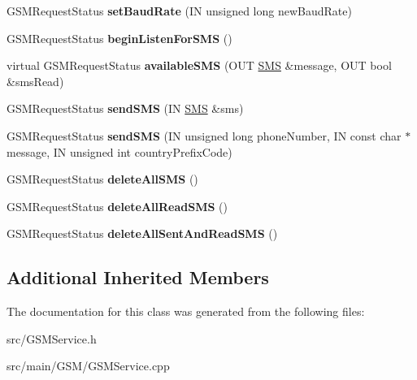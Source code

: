 \begin{DoxyCompactItemize}
G\+S\+M\+Request\+Status {\bfseries set\+Baud\+Rate} (IN unsigned long new\+Baud\+Rate)
\item 
\mbox{\label{class_easyuino_1_1_g_s_m_service_a8fd764ef215a16f676e6e5e4b283b61d}} 
G\+S\+M\+Request\+Status {\bfseries begin\+Listen\+For\+S\+MS} ()
\item 
\mbox{\label{class_easyuino_1_1_g_s_m_service_a4d987881793f811e1a032bc48e5f7861}} 
virtual G\+S\+M\+Request\+Status {\bfseries available\+S\+MS} (O\+UT \hyperlink{class_easyuino_1_1_s_m_s}{S\+MS} \&message, O\+UT bool \&sms\+Read)
\item 
\mbox{\label{class_easyuino_1_1_g_s_m_service_ae860cc330ef552c733d9ab4a5c2fd366}} 
G\+S\+M\+Request\+Status {\bfseries send\+S\+MS} (IN \hyperlink{class_easyuino_1_1_s_m_s}{S\+MS} \&sms)
\item 
\mbox{\label{class_easyuino_1_1_g_s_m_service_ad37d83f2a91fbe2e50a11f1d435eccb5}} 
G\+S\+M\+Request\+Status {\bfseries send\+S\+MS} (IN unsigned long phone\+Number, IN const char $\ast$message, IN unsigned int country\+Prefix\+Code)
\item 
\mbox{\label{class_easyuino_1_1_g_s_m_service_aef4379e7c82f275f0af341f79a3b451f}} 
G\+S\+M\+Request\+Status {\bfseries delete\+All\+S\+MS} ()
\item 
\mbox{\label{class_easyuino_1_1_g_s_m_service_af142e4f7d99cffda9a3598446466cdb3}} 
G\+S\+M\+Request\+Status {\bfseries delete\+All\+Read\+S\+MS} ()
\item 
\mbox{\label{class_easyuino_1_1_g_s_m_service_a7b457ab0669a8e9c16ab1906cc246365}} 
G\+S\+M\+Request\+Status {\bfseries delete\+All\+Sent\+And\+Read\+S\+MS} ()
\end{DoxyCompactItemize}
\subsection*{Additional Inherited Members}


The documentation for this class was generated from the following files\+:\begin{DoxyCompactItemize}
\item 
src/G\+S\+M\+Service.\+h\item 
src/main/\+G\+S\+M/G\+S\+M\+Service.\+cpp\end{DoxyCompactItemize}
